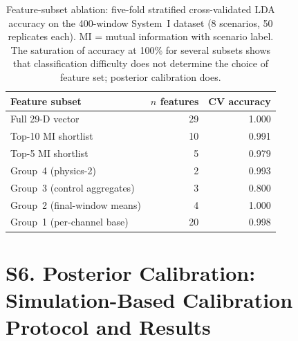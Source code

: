 \documentclass[aps,pre,twocolumn,superscriptaddress]{revtex4-2}
\begin{document}
\begin{table}[htbp]
\centering
\caption{Feature-subset ablation: five-fold stratified cross-validated LDA
  accuracy on the 400-window System~I dataset (8 scenarios, 50 replicates each).
  MI = mutual information with scenario label.  The saturation of accuracy at
  100\% for several subsets shows that classification difficulty does not
  determine the choice of feature set; posterior calibration does.}
\label{tab:si_feature_ablation}
\small
\begin{tabular}{lrr}
\toprule
Feature subset                    & $n$ features & CV accuracy \\
\midrule
Full 29-D vector                  & 29  & 1.000 \\
Top-10 MI shortlist               & 10  & 0.991 \\
Top-5 MI shortlist                & 5   & 0.979 \\
Group~4 (physics-2)               & 2   & 0.993 \\
Group~3 (control aggregates)      & 3   & 0.800 \\
Group~2 (final-window means)      & 4   & 1.000 \\
Group~1 (per-channel base)        & 20  & 0.998 \\
\bottomrule
\end{tabular}
\end{table}

\section*{S6.\; Posterior Calibration: Simulation-Based Calibration Protocol
  and Results}
\label{sec:si_sbc}
\end{document}
